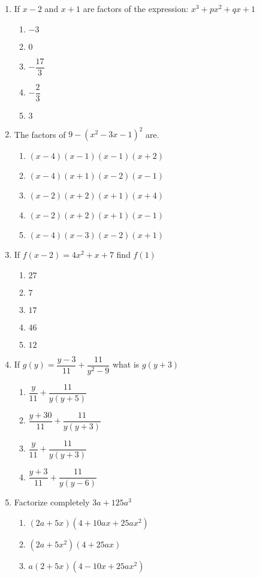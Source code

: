 \begin{multicols}{2}
\begin{enumerate}[label={\arabic*.}]
\item If \(x-2\) and \(x+1\) are factors of the expression: \({x}^{3}+p{x}^{2}+qx+1\)
	\begin{enumerate}[label={\Alph*.}]
	\item \(-3\)
	\item \(0\)
	\item \(-\dfrac{17}{3}\)
	\item \(-\dfrac{2}{3}\)
	\item \(3\)
	\end{enumerate}
\item The factors of \(9-({x}^{2}-3x-1)^2\) are. 
	\begin{enumerate}[label={\Alph*.}]
	\item \((x-4)(x-1)(x-1)(x+2)\)
	\item \((x-4)(x+1)(x-2)(x-1)\)
	\item \((x-2)(x+2)(x+1)(x+4)\)
	\item \((x-2)(x+2)(x+1)(x-1)\)
	\item \((x-4)(x-3)(x-2)(x+1)\)
	\end{enumerate}
\item If \(f(x-2) = 4{x}^{2} + x + 7 \) find \(f(1)\)
	\begin{enumerate}[label={\Alph*.}]
	\item \(27\)
	\item \(7\)
	\item \(17\)
	\item \(46\)
	\item \(12\)
	\end{enumerate}
\item If \(g(y) = \dfrac{y - 3}{11} + \dfrac{11}{y^2-9}\) what is \(g(y+3)\)
	\begin{enumerate}[label={\Alph*.}]
	\item \(\dfrac{y}{11} + \dfrac{11}{y(y+5)}\)
	\item \(\dfrac{y+30}{11} + \dfrac{11}{y(y+3)}\)
	\item \(\dfrac{y}{11} + \dfrac{11}{y(y+3)}\)
	\item \(\dfrac{y+3}{11}+\dfrac{11}{y(y-6)}\)
	\end{enumerate}
\item Factorize completely \(3a+125a^3\)
	\begin{enumerate}[label={\Alph*.}]
	\item \((2a+5x)(4+10ax + 25a{x}^{2})\)
	\item \((2a+5{x}^{2})(4+25ax)\)
	\item \(a(2+5x)(4-10x+25a{x}^{2})\)

\end{enumerate}
\end{enumerate}
\end{multicols}

